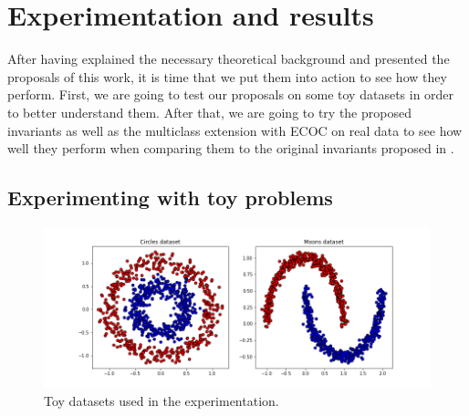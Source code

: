 \chapter{Experimentation and results}
\label{Chapter4}

After having explained the necessary theoretical background and presented the proposals
of this work, it is time that we put them into action to see how they perform. First, we are going
to test our proposals on some toy datasets in order to better understand them. After that, we are going
to try the proposed invariants as well as the multiclass extension with ECOC on real data to see how
well they perform when comparing them to the original invariants proposed in \cite{Vapnik2019}.

\section{Experimenting with toy problems}

\begin{figure}
    \centering
    \includegraphics[width=\textwidth]{thesis/Figures/toy_datasets.png}
    \caption{Toy datasets used in the experimentation.}
    \label{fig:toy_datasets}
\end{figure}

